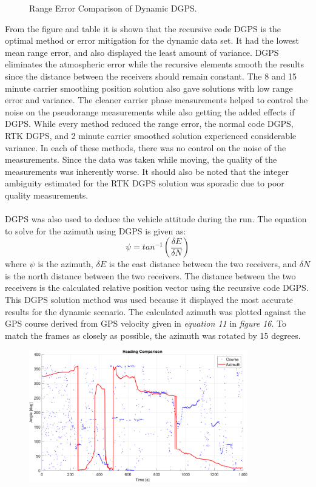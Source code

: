 \documentclass[11pt]{article}
\begin{document}
\begin{enumerate}[label=\textbf{\arabic*.}]
\begin{figure}[H]
          \caption{Range Error Comparison of Dynamic DGPS.}
      \end{figure}
      From the figure and table it is shown that the recursive code DGPS is the optimal 
      method or error mitigation for the dynamic data set. It had the lowest mean range 
      error, and also displayed the least amount of variance. DGPS eliminates the atmospheric 
      error while the recursive elements smooth the results since the distance between the 
      receivers should remain constant. The 8 and 15 minute carrier 
      smoothing position solution also gave solutions with low range error and variance. The 
      cleaner carrier phase measurements helped to control the noise on the pseudorange 
      measurements while also getting the added effects if DGPS. While every method reduced 
      the range error, the normal code DGPS, RTK DGPS, and 2 minute carrier smoothed solution 
      experienced considerable variance. In each of these methods, there was no control on 
      the noise of the measurements. Since the data was taken while moving, the quality of 
      the measurements was inherently worse. It should also be noted that the integer 
      ambiguity estimated for the RTK DGPS solution was sporadic due to poor quality 
      measurements. 
      \\ \\
      DGPS was also used to deduce the vehicle attitude during the run. The equation to 
      solve for the azimuth using DGPS is given as:
      \begin{equation}
        \psi=tan^{-1}\left({\dfrac{\delta E}{\delta N}}\right)
      \end{equation}
      where $\psi$ is the azimuth, $\delta E$ is the east distance between the two receivers, 
      and $\delta N$ is the north distance between the two receivers. The distance between 
      the two receivers is the calculated relative position vector using the recursive code 
      DGPS. This DGPS solution method was used because it displayed the most accurate results 
      for the dynamic scenario. The calculated azimuth was plotted against the GPS course 
      derived from GPS velocity given in \emph{equation 11} in \emph{figure 16}. To match 
      the frames as closely as possible, the azimuth was rotated by 15 degrees.
      \begin{figure}[H]
        \centering
        \includegraphics[width=0.85\textwidth]{p3_e.png}

\end{figure}
\end{enumerate}
\end{document}
